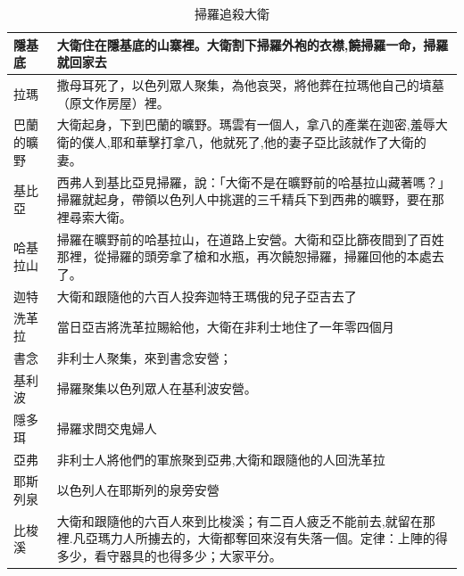 \begin{table}[H]
\begin{tabular}{|p{1.5cm}|p{15cm}|}
隱基底& 大衛住在隱基底的山寨裡。大衛割下掃羅外袍的衣襟,饒掃羅一命，掃羅就回家去\\\hline
拉瑪& 撒母耳死了，以色列眾人聚集，為他哀哭，將他葬在拉瑪他自己的墳墓（原文作房屋）裡。\\\hline
巴蘭的曠野&大衛起身，下到巴蘭的曠野。瑪雲有一個人，拿八的產業在迦密,羞辱大衛的僕人,耶和華擊打拿八，他就死了,他的妻子亞比該就作了大衛的妻。 \\\hline
基比亞& 西弗人到基比亞見掃羅，說：「大衛不是在曠野前的哈基拉山藏著嗎？」掃羅就起身，帶領以色列人中挑選的三千精兵下到西弗的曠野，要在那裡尋索大衛。\\\hline
哈基拉山&掃羅在曠野前的哈基拉山，在道路上安營。大衛和亞比篩夜間到了百姓那裡，從掃羅的頭旁拿了槍和水瓶，再次饒恕掃羅，掃羅回他的本處去了。 \\\hline
迦特&大衛和跟隨他的六百人投奔迦特王瑪俄的兒子亞吉去了\\\hline
洗革拉&當日亞吉將洗革拉賜給他，大衛在非利士地住了一年零四個月\\\hline
書念&非利士人聚集，來到書念安營；\\\hline
基利波&掃羅聚集以色列眾人在基利波安營。\\\hline
隱多珥&掃羅求問交鬼婦人\\\hline
亞弗&非利士人將他們的軍旅聚到亞弗,大衛和跟隨他的人回洗革拉\\\hline
耶斯列泉&以色列人在耶斯列的泉旁安營\\\hline
比梭溪&大衛和跟隨他的六百人來到比梭溪；有二百人疲乏不能前去,就留在那裡.凡亞瑪力人所擄去的，大衛都奪回來沒有失落一個。定律：上陣的得多少，看守器具的也得多少；大家平分。\\\hline
\end{tabular}
\caption{掃羅追殺大衛}
\end{table}

